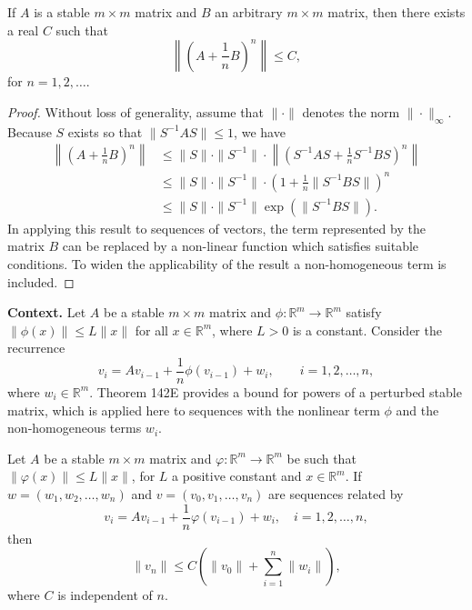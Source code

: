 \begin{theorem}

  \label{thm:142E}
If \( A \) is a stable \( m \times m \) matrix and \( B \) an arbitrary \( m \times m \) matrix, then there exists a real \( C \) such that
\[
\left\| \left( A + \frac{1}{n} B \right)^n \right\| \leq C,
\]
for \( n = 1, 2, \dots \).
\end{theorem}

\begin{proof}
Without loss of generality, assume that \( \|\cdot\| \) denotes the norm \( \|\cdot\|_\infty \).
Because \( S \) exists so that \( \| S^{-1} A S \| \leq 1 \), we have
\begin{align*}
\left\| \left( A + \frac{1}{n} B \right)^n \right\| &\leq \| S \| \cdot \| S^{-1} \| \cdot \left\| \left( S^{-1} A S + \frac{1}{n} S^{-1} B S \right)^n \right\| \\
&\leq \| S \| \cdot \| S^{-1} \| \cdot \left( 1 + \frac{1}{n} \| S^{-1} B S \| \right)^n \\
&\leq \| S \| \cdot \| S^{-1} \| \exp\left( \| S^{-1} B S \| \right).
\end{align*}
In applying this result to sequences of vectors, the term represented by the matrix \( B \) can be replaced by a non-linear function which satisfies suitable conditions. To widen the applicability of the result a non-homogeneous term is included.
\end{proof}

\noindent\textbf{Context.}
Let $A$ be a stable $m \times m$ matrix and $\phi:\mathbb{R}^m\to\mathbb{R}^m$ satisfy $\|\phi(x)\|\le L\|x\|$ for all $x\in\mathbb{R}^m$, where $L>0$ is a constant. Consider the recurrence
\begin{equation}
v_i = A v_{i-1} + \frac{1}{n}\phi(v_{i-1}) + w_i, \qquad i=1,2,\dots,n,
\tag{142a}
\end{equation}
where $w_i\in\mathbb{R}^m$. Theorem 142E provides a bound for powers of a perturbed stable matrix, which is applied here to sequences with the nonlinear term $\phi$ and the non‑homogeneous terms $w_i$.

\begin{theorem}

  \label{thm:142F}
Let \( A \) be a stable \( m \times m \) matrix and \( \varphi : \mathbb{R}^m \to \mathbb{R}^m \) be such that \( \|\varphi(x)\| \leq L \|x\| \), for \( L \) a positive constant and \( x \in \mathbb{R}^m \). If \( w = (w_1, w_2, \dots, w_n) \) and \( v = (v_0, v_1, \dots, v_n) \) are sequences related by
\[
v_i = A v_{i-1} + \frac{1}{n} \varphi(v_{i-1}) + w_i, \quad i = 1, 2, \dots, n, \tag{142a}
\]
then
\[
\|v_n\| \leq C \left( \|v_0\| + \sum_{i=1}^n \|w_i\| \right),
\]
where \( C \) is independent of \( n \).
\end{theorem}


